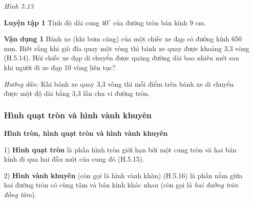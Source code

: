 \begin{lesson}
    \begin{center}

    \textit{Hình 5.13}
    \end{center}

    \textbf{Luyện tập 1} Tính độ dài cung $40^\circ$ của đường tròn bán kính $9$ cm.

    \answerline
    \answerline

    \textbf{Vận dụng 1} Bánh xe (khi bơm căng) của một chiếc xe đạp có đường kính 650 mm. Biết rằng khi giò đĩa quay một vòng thì bánh xe quay được khoảng 3,3 vòng (H.5.14). Hỏi chiếc xe đạp di chuyển được quãng đường dài bao nhiêu mét sau khi người đi xe đạp 10 vòng liên tục?

    \textit{Hướng dẫn:} Khi bánh xe quay 3,3 vòng thì mỗi điểm trên bánh xe di chuyển được một độ dài bằng 3,3 lần chu vi đường tròn.


    \answerline
    \answerline

    \subsubsection{Hình quạt tròn và hình vành khuyên}

    \textbf{Hình tròn, hình quạt tròn và hình vành khuyên}

    \begin{keyconcept}
        1) \textbf{Hình quạt tròn} là phần hình tròn giới hạn bởi một cung tròn và hai bán kính đi qua hai đầu mút của cung đó (H.5.15).

        2) \textbf{Hình vành khuyên} (còn gọi là hình vành khăn) (H.5.16) là phần nằm giữa hai đường tròn có cùng tâm và bán kính khác nhau (còn gọi là \textit{hai đường tròn đồng tâm}).
    \end{keyconcept}


\end{lesson}
